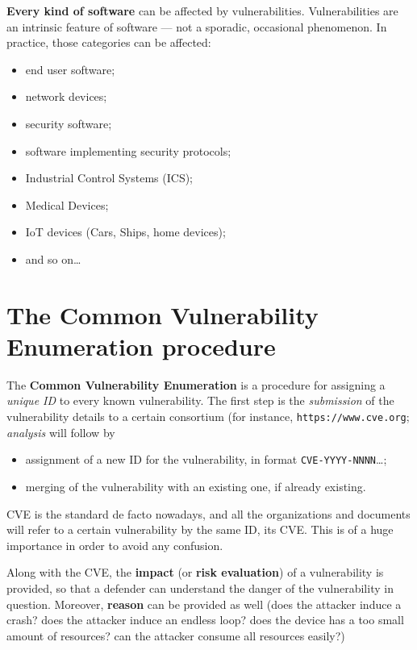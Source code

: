 \documentclass[10pt]{\classname}
\begin{document}
\textbf{Every kind of software} can be affected by vulnerabilities.
Vulnerabilities are an intrinsic feature of software --- not a sporadic,
occasional phenomenon. In practice, those categories can be affected:
\begin{itemize}
    \item end user software;
    \item network devices;
    \item security software;
    \item software implementing security protocols;
    \item Industrial Control Systems (ICS);
    \item Medical Devices;
    \item IoT devices (Cars, Ships, home devices);
    \item and so on\dots
\end{itemize}


\section{The Common Vulnerability Enumeration procedure}

The \textbf{Common Vulnerability Enumeration} is a procedure for assigning a
\emph{unique ID} to every known vulnerability. The first step is the
\emph{submission} of the vulnerability details to a certain consortium (for
instance, \texttt{https://\-www\-.cve.org}; \emph{analysis} will follow by
\begin{itemize}
    \item assignment of a new ID for the vulnerability, in format
        \texttt{CVE-YYYY-NNNN}\dots;
    \item merging of the vulnerability with an existing one, if already
        existing.
\end{itemize}

CVE is the standard de facto nowadays, and all the organizations and documents
will refer to a certain vulnerability by the same ID, its CVE. This is of a
huge importance in order to avoid any confusion.

Along with the CVE, the \textbf{impact} (or \textbf{risk evaluation}) of a
vulnerability is provided, so that a defender can understand the danger of the
vulnerability in question. Moreover, \textbf{reason} can be provided as well
(does the attacker induce a crash? does the attacker induce an endless loop?
does the device has a too small amount of resources? can the attacker consume
all resources easily?)
\end{document}
